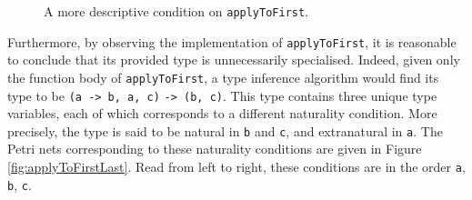 \documentclass[../../Reflection.tex]{subfiles}
\begin{document}
\begin{figure}[H]
\begin{center}
    \end{center}
\caption{A more descriptive condition on \lstinline{applyToFirst}.}
\label{fig:applyToFirstBetter}
\end{figure}

Furthermore, by observing the implementation of \lstinline{applyToFirst}, it is reasonable to conclude that its provided type is unnecessarily specialised. Indeed, given only the function body of \lstinline{applyToFirst}, a type inference algorithm would find its type to be \lstinline{(a -> b, a, c)} \lstinline{-> (b, c)}. This type contains three unique type variables, each of which corresponds to a different naturality condition. More precisely, the type is said to be natural in \lstinline{b} and \lstinline{c}, and extranatural in \lstinline{a}. The Petri nets corresponding to these naturality conditions are given in Figure \ref{fig:applyToFirstLast}. Read from left to right, these conditions are in the order \lstinline{a}, \lstinline{b}, \lstinline{c}.
\end{document}
